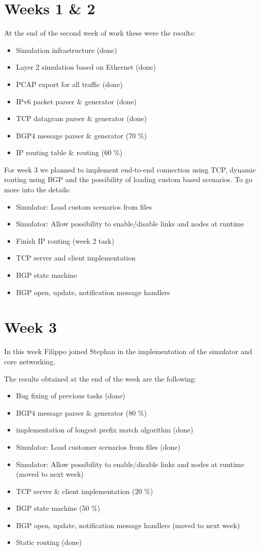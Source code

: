 \section{Weeks 1 \& 2}
At the end of the second week of work these were the results:

\begin{itemize}
 \item Simulation infrastructure (done)
 \item Layer 2 simulation based on Ethernet (done)
 \item PCAP export for all traffic (done)
 \item IPv6 packet parser \& generator (done)
 \item TCP datagram parser \& generator (done)
 \item BGP4 message parser \& generator (70 \%)
 \item IP routing table \& routing (60 \%)
\end{itemize}

For week 3 we planned to implement end-to-end connection using TCP, dynamic routing using BGP and the possibility of loading custom based scenarios.
To go more into the details:

\begin{itemize}
 \item Simulator: Load custom scenarios from files
 \item Simulator: Allow possibility to enable/disable links and nodes at runtime
 \item Finish IP routing (week 2 task)
 \item TCP server and client implementation
 \item BGP state machine
 \item BGP open, update, notification message handlers
\end{itemize}

\section{Week 3}
In this week Filippo joined Stephan in the implementation of the simulator and core networking.

The results obtained at the end of the week are the following:

\begin{itemize}
 \item Bug fixing of previous tasks (done)
 \item BGP4 message parser \& generator (80 \%)
 \item implementation of longest prefix match algorithm (done)
 \item Simulator: Load customer scenarios from files (done)
 \item Simulator: Allow possibility to enable/disable links and nodes at runtime (moved to next week)
 \item TCP server \& client implementation (20 \%)
 \item BGP state machine (50 \%)
 \item BGP open, update, notification message handlers (moved to next week)
 \item Static routing (done)
\end{itemize}

